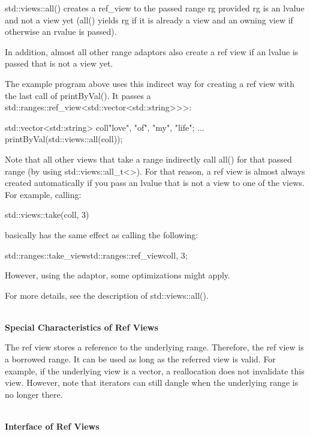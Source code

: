 std::views::all() creates a ref\_view to the passed range rg provided rg is an lvalue and not a view yet (all() yields rg if it is already a view and an owning view if otherwise an rvalue is passed).

In addition, almost all other range adaptors also create a ref view if an lvalue is passed that is not a view yet.

The example program above uses this indirect way for creating a ref view with the last call of printByVal(). It passes a std::ranges::ref\_view<std::vector<std::string>{}>{}>:

\begin{cpp}
std::vector<std::string> coll{"love", "of", "my", "life"};
...
printByVal(std::views::all(coll));
\end{cpp}

Note that all other views that take a range indirectly call all() for that passed range (by using std::views::all\_t<>). For that reason, a ref view is almost always created automatically if you pass an lvalue that is not a view to one of the views. For example, calling:

\begin{cpp}
std::views::take(coll, 3)
\end{cpp}

basically has the same effect as calling the following:

\begin{cpp}
std::ranges::take_view{std::ranges::ref_view{coll}, 3};
\end{cpp}

However, using the adaptor, some optimizations might apply.

For more details, see the description of std::views::all().

\noindent
\hspace*{\fill} \\ %
\textbf{Special Characteristics of Ref Views}

The ref view stores a reference to the underlying range. Therefore, the ref view is a borrowed range. It can be used as long as the referred view is valid. For example, if the underlying view is a vector, a reallocation does not invalidate this view. However, note that iterators can still dangle when the underlying range is no longer there.


\noindent
\hspace*{\fill} \\ %
\textbf{Interface of Ref Views}

